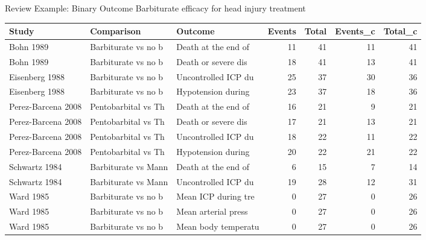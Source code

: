\documentclass[english]{beamer}\usepackage[]{graphicx}\usepackage[]{color}
\begin{document}
\begin{frame}[fragile]{Review Example: Binary Outcome}
Barbiturate efficacy for head injury treatment
\vspace{-5mm}
\begin{table}[ht]
\centering
\begingroup\tiny
\begin{tabular}{lllrrrr}
  \hline
Study & Comparison & Outcome & Events & Total & Events\_c & Total\_c \\ 
  \hline
Bohn 1989 & Barbiturate vs no b & Death at the end of & 11 & 41 & 11 & 41 \\ 
  Bohn 1989 & Barbiturate vs no b & Death or severe dis & 18 & 41 & 13 & 41 \\ 
  Eisenberg 1988 & Barbiturate vs no b & Uncontrolled ICP du & 25 & 37 & 30 & 36 \\ 
  Eisenberg 1988 & Barbiturate vs no b & Hypotension during  & 23 & 37 & 18 & 36 \\ 
  Perez-Barcena 2008 & Pentobarbital vs Th & Death at the end of & 16 & 21 & 9 & 21 \\ 
  Perez-Barcena 2008 & Pentobarbital vs Th & Death or severe dis & 17 & 21 & 13 & 21 \\ 
  Perez-Barcena 2008 & Pentobarbital vs Th & Uncontrolled ICP du & 18 & 22 & 11 & 22 \\ 
  Perez-Barcena 2008 & Pentobarbital vs Th & Hypotension during  & 20 & 22 & 21 & 22 \\ 
  Schwartz 1984 & Barbiturate vs Mann & Death at the end of & 6 & 15 & 7 & 14 \\ 
  Schwartz 1984 & Barbiturate vs Mann & Uncontrolled ICP du & 19 & 28 & 12 & 31 \\ 
  Ward 1985 & Barbiturate vs no b & Mean ICP during tre & 0 & 27 & 0 & 26 \\ 
  Ward 1985 & Barbiturate vs no b & Mean arterial press & 0 & 27 & 0 & 26 \\ 
  Ward 1985 & Barbiturate vs no b & Mean body temperatu & 0 & 27 & 0 & 26 \\ 
   \hline
\end{tabular}
\endgroup
\label{barbiturates}
\end{table}

\end{frame}
\end{document}
